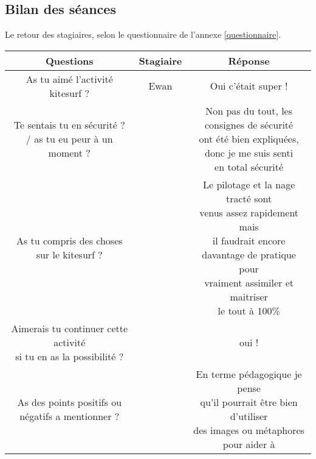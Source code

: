 \documentclass[12pt,a4paper]{report}
\begin{document}
\subsection{Bilan des séances}
Le retour des stagiaires, selon le questionnaire de l'annexe \ref{questionnaire}.
\begin{table}
\begin{tabular}{|c|c|c}
        \hline
        \textbf{\small{Questions}}                & \textbf{\small{Stagiaire}} & \textbf{\small{Réponse}}   \\ 
        \hline
  \small{As tu aimé l'activité kitesurf ?}  &  Ewan   & \small{Oui c'était super !}   \\
        \hline
        \shortstack{Te sentais tu en sécurité ? \\
        / as tu eu peur à un moment ?}     &         & \shortstack{Non pas du tout, les consignes de sécurité \\
        ont été bien expliquées, donc je me suis senti \\ en total sécurité} \\
        \hline
        As tu compris des choses sur le kitesurf ? & &  \shortstack{Le pilotage et la nage tracté sont  \\    
                                                                    venus assez rapidement mais \\
                                                                     il faudrait encore \\
                                                                    davantage de pratique pour \\
                                                               vraiment assimiler et maitriser \\
                                                                 le tout à 100\%}\\
        \hline
        \shortstack{Aimerais tu continuer cette activité\\ 
         si tu en as la possibilité ?}          & &oui ! \\
         \hline
      As des points positifs ou négatifs a mentionner ? & & \shortstack{En terme pédagogique je pense \\
                                                                        qu'il pourrait \^etre bien d'utiliser \\
                                                                        des images ou métaphores pour aider à \\
}
\end{tabular}
\end{table}
\end{document}
